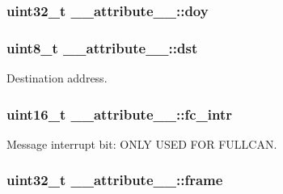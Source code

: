 \subsubsection[{\texorpdfstring{doy}{doy}}]{\setlength{\rightskip}{0pt plus 5cm}uint32\+\_\+t \+\_\+\+\_\+attribute\+\_\+\+\_\+\+::doy}\hypertarget{struct____attribute_____ac556a14ae593d1f3d46e166263313c75}{}\label{struct____attribute_____ac556a14ae593d1f3d46e166263313c75}
\subsubsection[{\texorpdfstring{dst}{dst}}]{\setlength{\rightskip}{0pt plus 5cm}uint8\+\_\+t \+\_\+\+\_\+attribute\+\_\+\+\_\+\+::dst}\hypertarget{struct____attribute_____a3522c1d748831637cd29787e401f670b}{}\label{struct____attribute_____a3522c1d748831637cd29787e401f670b}


Destination address. 

\subsubsection[{\texorpdfstring{fc\+\_\+intr}{fc_intr}}]{\setlength{\rightskip}{0pt plus 5cm}uint16\+\_\+t \+\_\+\+\_\+attribute\+\_\+\+\_\+\+::fc\+\_\+intr}\hypertarget{struct____attribute_____a3f327bada8b15b44b9a37ec975800f57}{}\label{struct____attribute_____a3f327bada8b15b44b9a37ec975800f57}


Message interrupt bit\+: O\+N\+LY U\+S\+ED F\+OR F\+U\+L\+L\+C\+AN. 

\subsubsection[{\texorpdfstring{frame}{frame}}]{\setlength{\rightskip}{0pt plus 5cm}uint32\+\_\+t \+\_\+\+\_\+attribute\+\_\+\+\_\+\+::frame}\hypertarget{struct____attribute_____a1c5c34a070f4e1a8c388cc990166125a}{}\label{struct____attribute_____a1c5c34a070f4e1a8c388cc990166125a}


